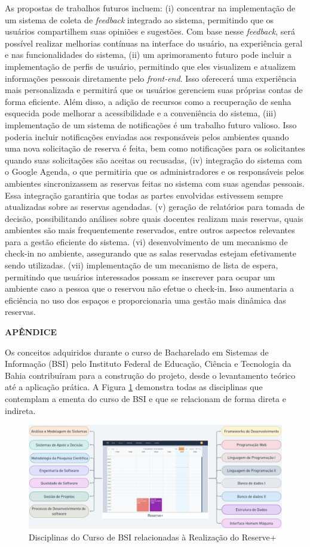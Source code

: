 \documentclass[12pt]{article}
\begin{document}
As propostas de trabalhos futuros incluem: (i) concentrar na implementação de um sistema de coleta de \textit{feedback} integrado ao sistema, permitindo que os usuários compartilhem suas opiniões e sugestões. Com base nesse \textit{feedback}, será possível realizar melhorias contínuas na interface do usuário, na experiência geral e nas funcionalidades do sistema, (ii) um aprimoramento futuro pode incluir a implementação de perfis de usuário, permitindo que eles visualizem e atualizem informações pessoais diretamente pelo \textit{front-end}. Isso oferecerá uma experiência mais personalizada e permitirá que os usuários gerenciem suas próprias contas de forma eficiente. Além disso, a adição de recursos como a recuperação de senha esquecida pode melhorar a acessibilidade e a conveniência do sistema, (iii) implementação de um sistema de notificações é um trabalho futuro valioso. Isso poderia incluir notificações enviadas aos responsáveis pelos ambientes quando uma nova solicitação de reserva é feita, bem como notificações para os solicitantes quando suas solicitações são aceitas ou recusadas, (iv) integração do sistema com o Google Agenda, o que permitiria que os administradores e os responsáveis pelos ambientes sincronizassem as reservas feitas no sistema com suas agendas pessoais. Essa integração garantiria que todas as partes envolvidas estivessem sempre atualizadas sobre as reservas agendadas. (v) geração de relatórios para tomada de decisão, possibilitando análises sobre quais docentes realizam mais reservas, quais ambientes são mais frequentemente reservados, entre outros aspectos relevantes para a gestão eficiente do sistema. (vi) desenvolvimento de um mecanismo de check-in no ambiente, assegurando que as salas reservadas estejam efetivamente sendo utilizadas. (vii) implementação de um mecanismo de lista de espera, permitindo que usuários interessados possam se inscrever para ocupar um ambiente caso a pessoa que o reservou não efetue o check-in. Isso aumentaria a eficiência no uso dos espaços e proporcionaria uma gestão mais dinâmica das reservas.




\newpage

\noindent\textbf{APÊNDICE}

Os conceitos adquiridos durante o curso de Bacharelado em Sistemas de Informação (BSI) pelo Instituto Federal de Educação, Ciência e Tecnologia da Bahia contribuíram para a construção do projeto, desde o levantamento teórico até a aplicação prática. A Figura \ref{fig:disciplinas} demonstra todas as disciplinas que contemplam a ementa do curso de BSI e que se relacionam de forma direta e indireta.

\begin{figure}[ht]
\centering
\includegraphics[width=1.0\textwidth]{disciplinas.jpg}
\caption{Disciplinas do Curso de BSI relacionadas à Realização do Reserve+}
\label{fig:disciplinas}
\end{figure}
\end{document}
